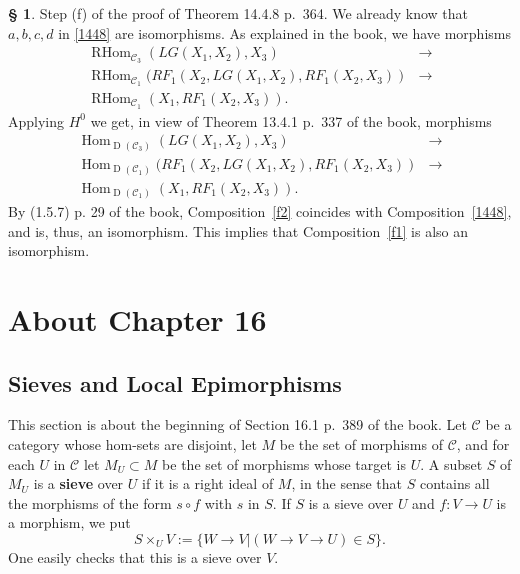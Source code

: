 \documentclass[12pt]{article}%
\theoremstyle{remark}
\theoremstyle{definition}
\newtheorem{s}[thm]{\S}%
\newcommand{\oo}{\operatorname}
\newcommand{\C}{\mathcal C}
\begin{document}
\begin{s}
Step (f) of the proof of Theorem 14.4.8 p.~364. We already know that $a,b,c,d$ in \eqref{1448} are isomorphisms. As explained in the book, we have morphisms  
\begin{equation}\label{f1}
\begin{split}
\oo{RHom}_{\C_3}(LG(X_1,X_2),X_3)&\to\\ 
\oo{RHom}_{\C_1}(RF_1(X_2,LG(X_1,X_2),RF_1(X_2,X_3))&\to\\ 
\oo{RHom}_{\C_1}(X_1,RF_1(X_2,X_3)).
\end{split}
\end{equation}
Applying $H^0$ we get, in view of Theorem 13.4.1 p.~337 of the book, morphisms 
\begin{equation}\label{f2}
\begin{split}
\oo{Hom}_{\oo D(\C_3)}(LG(X_1,X_2),X_3)&\to\\ 
\oo{Hom}_{\oo D(\C_1)}(RF_1(X_2,LG(X_1,X_2),RF_1(X_2,X_3))&\to\\ 
\oo{Hom}_{\oo D(\C_1)}(X_1,RF_1(X_2,X_3)).
\end{split}
\end{equation}
By (1.5.7) p. 29 of the book, Composition~\eqref{f2} coincides with Composition~\eqref{1448}, and is, thus, an isomorphism. This implies that Composition~\eqref{f1} is also an isomorphism.
\end{s}


\section{About Chapter 16}

\subsection{Sieves and Local Epimorphisms}

This section is about the beginning of Section 16.1 p.~389 of the book. Let $\C$ be a category whose hom-sets are disjoint, let $M$ be the set of morphisms of $\C$, and for each $U$ in $\C$ let $M_U\subset M$ be the set of morphisms whose target is $U$. A subset $S$ of $M_U$ is a \textbf{sieve}  over $U$ if it is a right ideal of $M$, in the sense that $S$ contains all the morphisms of the form $s\circ f$ with $s$ in $S$. If $S$ is a sieve over $U$ and $f:V\to U$ is a morphism, we put
$$
S\times_UV:=\{W\to V|(W\to V\to U)\in S\}.
$$
One easily checks that this is a sieve over $V$. 
\end{document}
